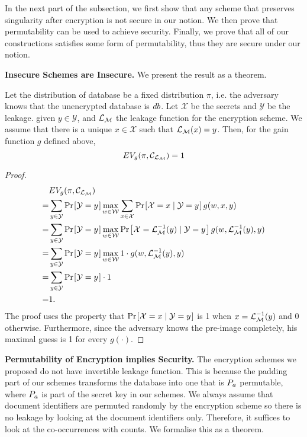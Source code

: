 In the next part of the subsection, we first show that any scheme that preserves singularity after encryption is not secure in our notion. We then prove that permutability can be used to achieve security. Finally, we prove that all of our constructions satisfies some form of permutability, thus they are secure under our notion.


\textbf{Insecure Schemes are Insecure.} We present the result as a theorem.

\begin{theorem}
Let the distribution of database be a fixed distribution $\pi$, i.e. the adversary knows that the unencrypted database is $db$. Let $\mathcal{X}$ be the secrets and $\mathcal{Y}$ be the leakage. given $y \in \mathcal{Y}$, and $\mathcal{L}_\mathcal{M}$ the leakage function for the encryption scheme. We assume that there is a unique $x \in \mathcal{X}$ such that $\mathcal{L}_\mathcal{M}(x) = y$. Then, for the gain function $g$ defined above,
\begin{equation}
	EV_g(\pi, \mathcal{C}_{\mathcal{L}_\mathcal{M}}) = 1
\end{equation}
\end{theorem}

\begin{proof}
\begin{align*}
  & EV_g(\pi, \channelm) \\
= & \sum_{y \in {\mathcal{Y}}} \prob{\mathcal{Y} = y} \max_{w \in {\mathcal{W}}} \sum_{x \in {\mathcal{X}}} \prob{\mathcal{X} = x \mid \mathcal{Y} = y} g(w, x, y) \\
= & \sum_{y \in {\mathcal{Y}}} \prob{\mathcal{Y} = y} \max_{w \in {\mathcal{W}}} \prob{\mathcal{X} = \leakm^{-1}(y) \mid \mathcal{Y} = y} g(w, \leakm^{-1}(y), y) \\
= & \sum_{y \in {\mathcal{Y}}} \prob{\mathcal{Y} = y} \max_{w \in {\mathcal{W}}} 1 \cdot g(w, \leakm^{-1}(y), y) \\
= & \sum_{y \in {\mathcal{Y}}} \prob{\mathcal{Y} = y} \cdot 1 \\
= & 1.
\end{align*}
The proof uses the property that $\prob{\mathcal{X} = x \mid \mathcal{Y} = y}$ is 1 when $x = \mathcal{L}_\mathcal{M}^{-1}(y)$ and 0 otherwise. Furthermore, since the adversary knows the pre-image completely, his maximal guess is 1 for every $g(\cdot)$.
\end{proof}




\textbf{Permutability of Encryption implies Security.} The encryption schemes we proposed do not have invertible leakage function. This is because the padding part of our schemes transforms the database into one that is $P_a$ permutable, where $P_a$ is part of the secret key in our schemes. We always assume that document identifiers are permuted randomly by the encryption scheme so there is no leakage by looking at the document identifiers only. Therefore, it suffices to look at the co-occurrences with counts. We formalise this as a theorem.

